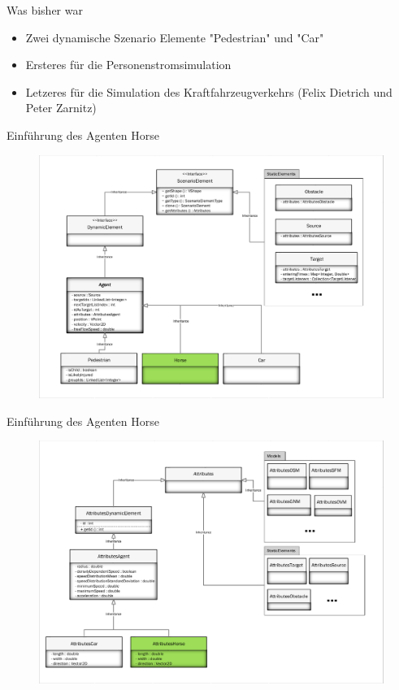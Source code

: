 \begin{frame}{Was bisher war}
	\begin{itemize}
		\item Zwei dynamische Szenario Elemente "Pedestrian" und "Car"
		\item Ersteres für die Personenstromsimulation
		\item Letzeres für die Simulation des Kraftfahrzeugverkehrs (Felix Dietrich und Peter Zarnitz) \cite{zarnitz-2015}
	\end{itemize}
\end{frame}

\begin{frame}{Einführung des Agenten Horse}
	\begin{figure}
		\includegraphics[width=\textwidth, keepaspectratio]{appendix/uml/ScenarioElements.pdf}
	\end{figure}
\end{frame}

\begin{frame}{Einführung des Agenten Horse}
	\begin{figure}
		\includegraphics[width=\textwidth, keepaspectratio]{appendix/uml/Attributes.pdf}
	\end{figure}
\end{frame}

